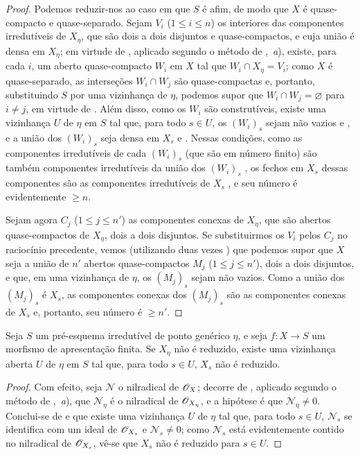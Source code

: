\begin{proof}
Podemos reduzir-nos ao caso em que $S$ é afim, de modo que $X$ é quase-compacto e quase-separado.
Sejam $V_i$ ($1\leqslant i\leqslant n$) os interiores das componentes irredutíveis de $X_\eta$, que são dois a dois disjuntos e quase-compactos, e cuja união é densa em $X_\eta$; em virtude de , aplicado segundo o método de ,~\emph{a}), existe, para cada $i$, um aberto quase-compacto $W_i$ em $X$ tal que $W_i\cap X_\eta=V_i$; como $X$ é quase-separado, as interseções $W_i\cap W_j$ são quase-compactas  e, portanto, substituindo $S$ por uma vizinhança de $\eta$, podemos supor que $W_i\cap W_j=\varnothing$ para $i\neq j$, em virtude de .
Além disso, como os $W_i$ são construtíveis, existe uma vizinhança $U$ de $\eta$ em $S$ tal que, para todo $s\in U$, os $(W_i)_s$ sejam não vazios  e , e a união dos $(W_i)_s$ seja densa em $X_s$  e .
Nessas condições, como as componentes irredutíveis de cada $(W_i)_s$ (que são em número finito) são também componentes irredutíveis da união dos $(W_i)_s$ , os fechos em $X_s$ dessas componentes são as componentes irredutíveis de $X_s$ , e seu número é evidentemente $\geqslant n$.

Sejam agora $C_j$ ($1\leqslant j\leqslant n'$) as componentes conexas de $X_\eta$, que são abertos quase-compactos de $X_\eta$, dois a dois disjuntos.
Se substituirmos os $V_i$ pelos $C_j$ no raciocínio precedente, vemos (utilizando duas vezes ) que podemos supor que $X$ seja a união de $n'$ abertos quase-compactos $M_j$ ($1\leqslant j\leqslant n'$), dois a dois disjuntos, e que, em uma vizinhança de $\eta$, os $(M_j)_s$ sejam não vazios.
Como a união dos $(M_j)_s$ é $X_s$, as componentes conexas dos $(M_j)_s$ são as componentes conexas de $X_s$ e, portanto, seu número é $\geqslant n'$.
\end{proof}


\begin{lemma}[9.7.2]
\label{IV.9.7.2}
Seja $S$ um pré-esquema irredutível de ponto genérico $\eta$, e seja $f:X\to S$ um morfismo de apresentação finita.
Se $X_\eta$ não é reduzido, existe uma vizinhança aberta $U$ de $\eta$ em $S$ tal que, para todo $s\in U$, $X_s$ não é reduzido.
\end{lemma}

\begin{proof}
Com efeito, seja $\mathscr{N}$ o nilradical de $\mathscr{O}_X$; decorre de , aplicado segundo o método de ,~\emph{a}), que $\mathscr{N}_\eta$ é o nilradical de $\mathscr{O}_{X_\eta}$, e a hipótese é que $\mathscr{N}_\eta\neq 0$.
Conclui-se de  e  que existe uma vizinhança $U$ de $\eta$ tal que, para todo $s\in U$, $\mathscr{N}_s$ se identifica com um ideal de $\mathscr{O}_{X_s}$ e $\mathscr{N}_s\neq 0$; como $\mathscr{N}_s$ está evidentemente contido no nilradical de $\mathscr{O}_{X_s}$, vê-se que $X_s$ não é reduzido para $s\in U$.
\end{proof}

